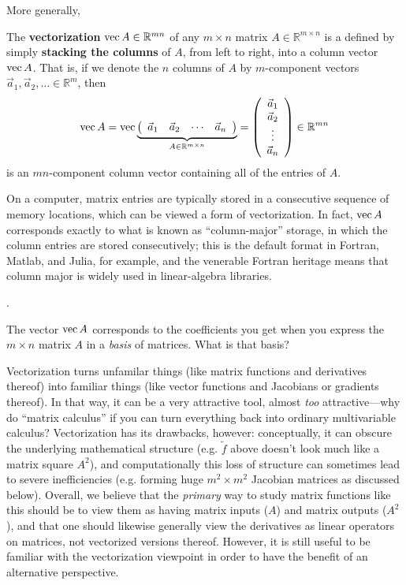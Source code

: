 More generally, \begin{definition}The \textbf{vectorization} $\operatorname{vec} A\in\mathbb{R}^{mn}$
of any $m\times n$ matrix $A\in\mathbb{R}^{m\times n}$ is a defined
by simply \textbf{stacking the columns} of $A$, from left to right,
into a column vector $\operatorname{vec} A$. That is, if we denote the $n$ columns
of $A$ by $m$-component vectors $\vec{a}_{1},\vec{a}_{2},\ldots\in\mathbb{R}^{m}$,
then
\[
\operatorname{vec} A=\operatorname{vec}\underbrace{\left(\begin{array}{cccc}
\vec{a}_{1} & \vec{a}_{2} & \cdots & \vec{a}_{n}\end{array}\right)}_{A\in\mathbb{R}^{m\times n}}=\left(\begin{array}{c}
\vec{a}_{1}\\
\vec{a}_{2}\\
\vdots\\
\vec{a}_{n}
\end{array}\right)\in\mathbb{R}^{mn}
\]
is an $mn$-component column vector containing all of the entries of
$A$.

On a computer, matrix entries are typically stored in a consecutive
sequence of memory locations, which can be viewed a form of vectorization.
In fact, $\operatorname{vec} A$ corresponds exactly to what is known as ``column-major''
storage, in which the column entries are stored consecutively; this
is the default format in Fortran, Matlab, and Julia, for example,
and the venerable Fortran heritage means that column major is widely used in
linear-algebra libraries. \end{definition}.

\begin{problem}The vector $\operatorname{vec} A$ corresponds to the coefficients
you get when you express the $m\times n$ matrix $A$ in a \emph{basis}
of matrices. What is that basis? \end{problem}

Vectorization turns unfamilar things (like matrix functions and derivatives
thereof) into familiar things (like vector functions and Jacobians
or gradients thereof). In that way, it can be a very attractive tool,
almost \emph{too} attractive---why do ``matrix calculus'' if you
can turn everything back into ordinary multivariable calculus? Vectorization
has its drawbacks, however: conceptually, it can obscure the underlying
mathematical structure (e.g. $\tilde{f}$ above doesn't look much
like a matrix square $A^{2}$), and computationally this loss of structure
can sometimes lead to severe inefficiencies (e.g. forming huge $m^2\times m^2$
Jacobian matrices as discussed below). Overall, we believe that the
\emph{primary} way to study matrix functions like this should be to
view them as having matrix inputs ($A$) and matrix outputs ($A^{2}$), and that one should likewise generally view the derivatives as linear operators on matrices,
not vectorized versions thereof. However, it is still useful to be
familiar with the vectorization viewpoint in order to have the benefit
of an alternative perspective.

